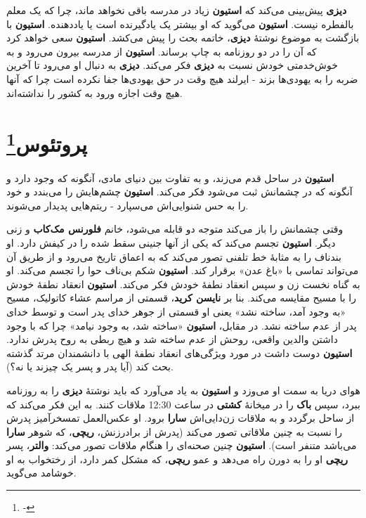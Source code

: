 \documentclass[12pt]{book}
\newcommand{\noun}[1]{{\textbf{#1}}}
\begin{document}
    \noun{دیزی} پیش‌بینی می‌کند که \noun{استیون} زیاد در مدرسه باقی نخواهد ماند، چرا که یک معلم بالفطره نیست. \noun{استیون} می‌گوید که او بیشتر یک یادگیرنده است یا یاددهنده. \noun{استیون} با بازگشت به موضوع نوشتهٔ \noun{دیزی}، خاتمه بحث را پیش می‌کشد. \noun{استیون} سعی خواهد کرد که آن را در دو روزنامه به چاپ برساند. \noun{استیون} از مدرسه بیرون می‌رود و به خوش‌خدمتی خودش نسبت به \noun{دیزی} فکر می‌کند. \noun{دیزی} به دنبال او می‌رود تا آخرین ضربه را به یهودی‌ها بزند - ایرلند هیچ وقت در حق یهودی‌ها جفا نکرده است چرا که آنها هیچ وقت اجازه ورود به کشور را نداشته‌اند.

    \chapter[پروتئوس]{پروتئوس\protect\footnote{-}}\label{ep:3}
    \noun{استیون} در ساحل قدم می‌زند، و به تفاوت بین دنیای مادی، آنگونه که وجود دارد و آنگونه که در چشمانش ثبت می‌شود فکر می‌کند. \noun{استیون} چشم‌هایش را می‌بندد و خود را به حس شنوایی‌اش می‌سپارد - ریتم‌هایی پدیدار می‌شوند.

    وقتی چشمانش را باز می‌کند متوجه دو قابله می‌شود، خانم \noun{فلورنس مک‌کاب} و زنی دیگر. \noun{استیون} تجسم می‌کند که یکی از آنها جنینی سقط شده را در کیفش دارد. او بندناف را به مثابهٔ خط تلفنی تصور می‌کند که به اعماق تاریخ می‌رود و از طریق آن می‌تواند تماسی با «باغ عدن» برقرار کند. \noun{استیون} شکم بی‌ناف حوا را تجسم می‌کند. او به گناه نخست زن و سپس انعقاد نطفهٔ خودش فکر می‌کند. \noun{استیون} انعقاد نطفهٔ خودش را با مسیح مقایسه می‌کند. بنا بر \noun{نایسن کرید}، قسمتی از مراسم عشاء کاتولیک، مسیح «به وجود آمد، ساخته نشد» یعنی او قسمتی از جوهر خدای پدر است و توسط خدای پدر از عدم ساخته نشد. در مقابل، \noun{استیون} «ساخته شد، به وجود نیامد» چرا که با وجود داشتن والدین واقعی، روحش از عدم ساخته شد و هیچ ربطی به روح پدرش ندارد. \noun{استیون} دوست داشت در مورد ویژگی‌های انعقاد نطفهٔ الهی با دانشمندان مرتد گذشته بحث کند (آیا پدر و پسر یک چیزند یا نه؟).

    هوای دریا به سمت او می‌وزد و \noun{استیون} به یاد می‌آورد که باید نوشتهٔ \noun{دیزی} را به روزنامه ببرد، سپس \noun{باک}  را در میخانهٔ \noun{کشتی} در ساعت 12:30 ملاقات کنند. به این فکر می‌کند که از ساحل برگردد و به ملاقات زن‌دایی‌اش \noun{سارا} برود. او عکس‌العمل تمسخرآمیز پدرش را نسبت به چنین ملاقاتی تصور می‌کند (پدرش از برادرزنش، \noun{ریچی}، که شوهر \noun{سارا} می‌باشد متنفر است). \noun{استیون} چنین صحنه‌ای را هنگام ملاقات تصور می‌کند: \noun{والتر}، پسر \noun{ریچی} او را به دورن راه می‌دهد و عمو \noun{ریچی}، که مشکل کمر دارد، از رختخواب به او خوشامد می‌گوید.
\end{document}
